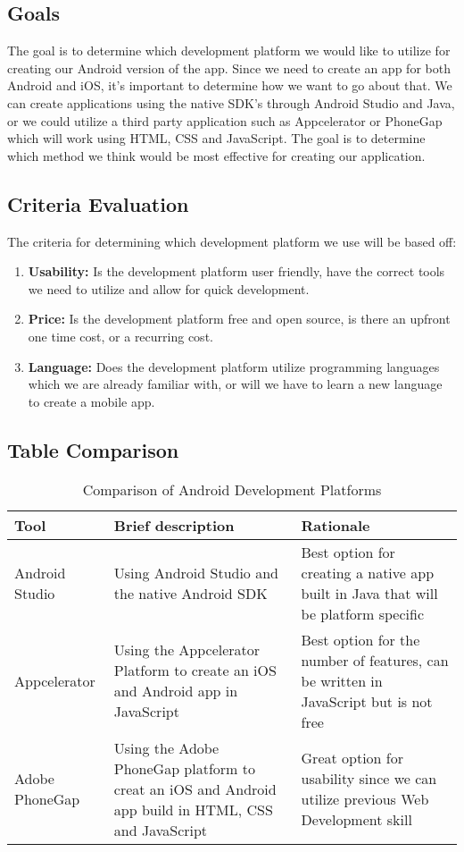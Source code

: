 \documentclass[letterpaper,10pt,draftclsnofoot,onecolumn,titlepage]{IEEEtran}
\begin{document}
		\subsection{Goals}
			The goal is to determine which development platform we would like to utilize for creating our Android version of the app.
			Since we need to create an app for both Android and iOS, it's important to determine how we want to go about that.
			We can create applications using the native SDK's through Android Studio and Java, or we could utilize a third party application such as Appcelerator or PhoneGap which will work using HTML, CSS and JavaScript.
			The goal is to determine which method we think would be most effective for creating our application.

		\subsection{Criteria Evaluation}
			The criteria for determining which development platform we use will be based off:
			\begin{enumerate}
				\item \textbf{Usability:} Is the development platform user friendly, have the correct tools we need to utilize and allow for quick development.
				\item \textbf{Price:} Is the development platform free and open source, is there an upfront one time cost, or a recurring cost.
				\item \textbf{Language:} Does the development platform utilize programming languages which we are already familiar with, or will we have to learn a new language to create a mobile app.
			\end{enumerate}

		\subsection{Table Comparison}
		\begin{table}[ht]
			\caption{Comparison of Android Development Platforms}
			\begin{center}
				\begin{tabular} { | m{3cm} | m{5cm} | m{5cm} | }
					\hline\hline
					Tool & Brief description & Rationale \\ [0.5ex]
					\hline
					Android Studio & Using Android Studio and the native Android SDK & Best option for creating a native app built in Java that will be platform specific \\
					\hline
					Appcelerator & Using the Appcelerator Platform to create an iOS and Android app in JavaScript & Best option for the number of features, can be written in JavaScript but is not free\\
					\hline
					Adobe PhoneGap & Using the Adobe PhoneGap platform to creat an iOS and Android app build in HTML, CSS and JavaScript & Great option for usability since we can utilize previous Web Development skill \\
					\hline
				\end{tabular}
			\end{center}
		\end{table}
\end{document}
